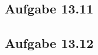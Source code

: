 \documentclass{standalone}
\begin{document}
\subsection{Aufgabe 13.11}


\subsection{Aufgabe 13.12}
\end{document}
